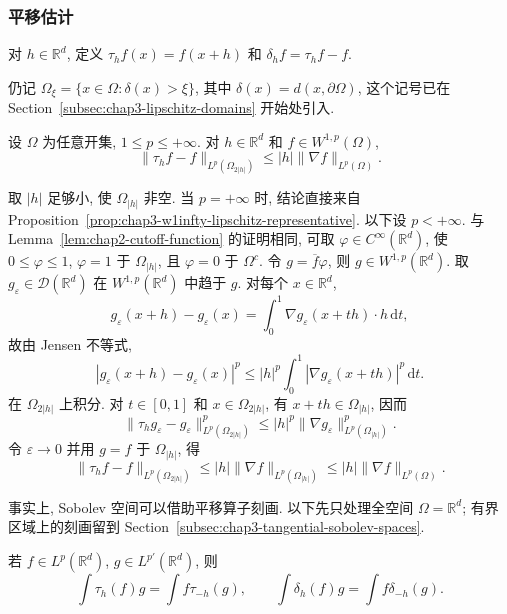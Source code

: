 \subsubsection{平移估计}
\label{subsec:chap3-translation-estimates}

\begin{Definition}
\label{def:chap3-translation-difference-operators}
对 $h\in\mathbb R^d$, 定义 $\tau_hf(x)=f(x+h)$ 和 $\delta_hf=\tau_hf-f$.
\end{Definition}

仍记 $\Omega_\xi=\{x\in\Omega:\delta(x)>\xi\}$, 其中 $\delta(x)=d(x,\partial\Omega)$, 这个记号已在 Section~\ref{subsec:chap3-lipschitz-domains} 开始处引入.

\begin{Theorem}
\label{thm:chap3-interior-translation-estimate}
设 $\Omega$ 为任意开集, $1\leq p\leq+\infty$. 对 $h\in\mathbb R^d$ 和 $f\in W^{1,p}(\Omega)$,
\[
 \|\tau_hf-f\|_{L^p(\Omega_{2|h|})}\leq|h|\|\nabla f\|_{L^p(\Omega)}.
\]
\end{Theorem}

\begin{Proof}
取 $|h|$ 足够小, 使 $\Omega_{|h|}$ 非空. 当 $p=+\infty$ 时, 结论直接来自 Proposition~\ref{prop:chap3-w1infty-lipschitz-representative}. 以下设 $p<+\infty$. 与 Lemma~\ref{lem:chap2-cutoff-function} 的证明相同, 可取 $\varphi\in C^\infty(\mathbb R^d)$, 使 $0\leq\varphi\leq1$, $\varphi=1$ 于 $\Omega_{|h|}$, 且 $\varphi=0$ 于 $\Omega^c$. 令 $g=\overline f\varphi$, 则 $g\in W^{1,p}(\mathbb R^d)$. 取 $g_\varepsilon\in\mathcal D(\mathbb R^d)$ 在 $W^{1,p}(\mathbb R^d)$ 中趋于 $g$. 对每个 $x\in\mathbb R^d$,
\[
 g_\varepsilon(x+h)-g_\varepsilon(x)=\int_0^1\nabla g_\varepsilon(x+th)\cdot h\,\mathrm dt,
\]
故由 Jensen 不等式,
\[
 |g_\varepsilon(x+h)-g_\varepsilon(x)|^p
 \leq|h|^p\int_0^1|\nabla g_\varepsilon(x+th)|^p\,\mathrm dt.
\]
在 $\Omega_{2|h|}$ 上积分. 对 $t\in[0,1]$ 和 $x\in\Omega_{2|h|}$, 有 $x+th\in\Omega_{|h|}$, 因而
\[
 \|\tau_hg_\varepsilon-g_\varepsilon\|_{L^p(\Omega_{2|h|})}^p
 \leq|h|^p\|\nabla g_\varepsilon\|_{L^p(\Omega_{|h|})}^p.
\]
令 $\varepsilon\to0$ 并用 $g=f$ 于 $\Omega_{|h|}$, 得
\[
 \|\tau_hf-f\|_{L^p(\Omega_{2|h|})}
 \leq|h|\|\nabla f\|_{L^p(\Omega_{|h|})}
 \leq|h|\|\nabla f\|_{L^p(\Omega)}.
\]
\end{Proof}

事实上, Sobolev 空间可以借助平移算子刻画. 以下先只处理全空间 $\Omega=\mathbb R^d$; 有界区域上的刻画留到 Section~\ref{subsec:chap3-tangential-sobolev-spaces}.

\begin{Lemma}
\label{lem:chap3-translation-duality}
若 $f\in L^p(\mathbb R^d)$, $g\in L^{p'}(\mathbb R^d)$, 则
\[
 \int\tau_h(f)g=\int f\tau_{-h}(g),\qquad
 \int\delta_h(f)g=\int f\delta_{-h}(g).
\]
\end{Lemma}

